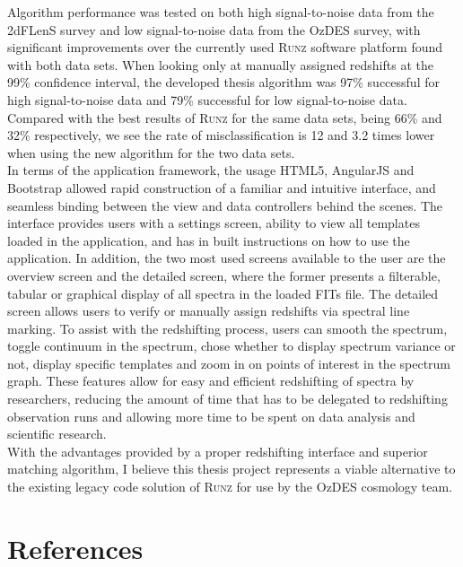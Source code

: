 \documentclass[titlesmallcaps, examinerscopy, copyrightpage]{uqthesis}
\newcommand{\runz}{\textsc{Runz}}
\begin{document}
Algorithm performance was tested on both high signal-to-noise data from the 2dFLenS survey and low signal-to-noise data from the OzDES survey, with significant improvements over the currently used \runz{} software platform found with both data sets. When looking only at manually assigned redshifts at the 99\% confidence interval, the developed thesis algorithm was 97\% successful for high signal-to-noise data and 79\% successful for low signal-to-noise data. Compared with the best results of \runz{} for the same data sets, being 66\% and 32\% respectively, we see the rate of misclassification is 12 and 3.2 times lower when using the new algorithm for the two data sets.\\

In terms of the application framework, the usage HTML5, AngularJS and Bootstrap allowed rapid construction of a familiar and intuitive interface, and seamless binding between the view and data controllers behind the scenes. The interface provides users with a settings screen, ability to view all templates loaded in the application, and has in built instructions on how to use the application. In addition, the two most used screens available to the user are the overview screen and the detailed screen, where the former presents a filterable, tabular or graphical display of all spectra in the loaded FITs file. The detailed screen allows users to verify or manually assign redshifts via spectral line marking. To assist with the redshifting process, users can smooth the spectrum, toggle continuum in the spectrum, chose whether to display spectrum variance or not, display specific templates and zoom in on points of interest in the spectrum graph. These features allow for easy and efficient redshifting of spectra by researchers, reducing the amount of time that has to be delegated to redshifting observation runs and allowing more time to be spent on data analysis and scientific research.\\

With the advantages provided by a proper redshifting interface and superior matching algorithm, I believe this thesis project represents a viable alternative to the existing legacy code solution of \runz{} for use by the OzDES cosmology team.

























\chapter*{References}
\begingroup
{}
\renewcommand{\addcontentsline}[3]{}
\renewcommand{\chapter}[2]{}

\endgroup


\end{document}
